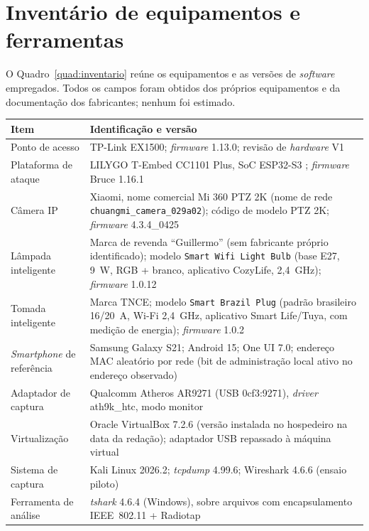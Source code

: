 \section{Inventário de equipamentos e ferramentas}
\label{sec:inventario}
\label{sec:equipamentos_ferramentas}

O Quadro~\ref{quad:inventario} reúne os equipamentos e as versões de \textit{software} empregados. Todos os campos foram obtidos dos próprios equipamentos e da documentação dos fabricantes; nenhum foi estimado.

\begin{quadro}[htbp]
\centering
\caption{Inventário de equipamentos e ferramentas}
\label{quad:inventario}
\marcadoresTabela
\small
\renewcommand{\arraystretch}{1.15}
\begin{tabular}{|>{\raggedright\arraybackslash}p{}|>{\raggedright\arraybackslash}p{}|}
\hline
\textbf{Item} & \textbf{Identificação e versão} \\ \hline
Ponto de acesso & TP-Link EX1500; \textit{firmware} 1.13.0; revisão de \textit{hardware} V1 \\ \hline
Plataforma de ataque & LILYGO T-Embed CC1101 Plus, SoC ESP32-S3 \cite{LilygoTEmbed,EspressifS3Datasheet}; \textit{firmware} Bruce 1.16.1 \cite{BruceFirmware} \\ \hline
Câmera IP & Xiaomi, nome comercial Mi 360 PTZ 2K (nome de rede \texttt{chuangmi\_camera\_029a02}); código de modelo PTZ 2K; \textit{firmware} 4.3.4\_0425 \\ \hline
Lâmpada inteligente & Marca de revenda ``Guillermo'' (sem fabricante próprio identificado); modelo \texttt{Smart Wifi Light Bulb} (base E27, 9~W, RGB + branco, aplicativo CozyLife, 2,4~GHz); \textit{firmware} 1.0.12 \\ \hline
Tomada inteligente & Marca TNCE; modelo \texttt{Smart Brazil Plug} (padrão brasileiro 16/20~A, Wi-Fi 2,4~GHz, aplicativo Smart Life/Tuya, com medição de energia); \textit{firmware} 1.0.2 \\ \hline
\textit{Smartphone} de referência & Samsung Galaxy S21; Android 15; One UI 7.0; endereço MAC aleatório por rede (bit de administração local ativo no endereço observado) \\ \hline
Adaptador de captura & Qualcomm Atheros AR9271 (USB 0cf3:9271), \textit{driver} ath9k\_htc, modo monitor \cite{Ath9kHtc} \\ \hline
Virtualização & Oracle VirtualBox 7.2.6 (versão instalada no hospedeiro na data da redação); adaptador USB repassado à máquina virtual \\ \hline
Sistema de captura & Kali Linux 2026.2; \textit{tcpdump} 4.99.6; Wireshark 4.6.6 (ensaio piloto) \\ \hline
Ferramenta de análise & \textit{tshark} 4.6.4 (Windows), sobre arquivos com encapsulamento IEEE~802.11 + Radiotap \\ \hline
\end{tabular}
\end{quadro}

